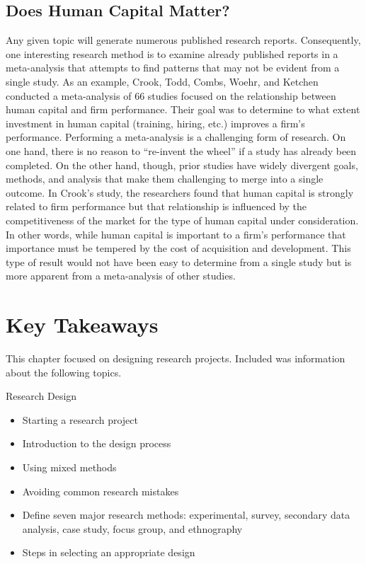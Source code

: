 \subsection{Does Human Capital Matter?}

Any given topic will generate numerous published research reports. Consequently, one interesting research method is to examine already published reports in a meta-analysis that attempts to find patterns that may not be evident from a single study. As an example, Crook, Todd, Combs, Woehr, and Ketchen conducted a meta-analysis of $ 66 $ studies focused on the relationship between human capital and firm performance\cite{crook2011does}. Their goal was to determine to what extent investment in human capital (training, hiring, etc.) improves a firm's performance. Performing a meta-analysis is a challenging form of research. On one hand, there is no reason to ``re-invent the wheel'' if a study has already been completed. On the other hand, though, prior studies have widely divergent goals, methods, and analysis that make them challenging to merge into a single outcome. In Crook's study, the researchers found that human capital is strongly related to firm performance but that relationship is influenced by the competitiveness of the market for the type of human capital under consideration. In other words, while human capital is important to a firm's performance that importance must be tempered by the cost of acquisition and development. This type of result would not have been easy to determine from a single study but is more apparent from a meta-analysis of other studies.

\section{Key Takeaways}\label{ch04:summary}

This chapter focused on designing research projects. Included was information about the following topics.

\begin{center}
	\begin{tkawybox}{Research Design}
		\begin{itemize}
			\setlength{\itemsep}{0pt}
			\setlength{\parskip}{0pt}
			\setlength{\parsep}{0pt}
			
			\item Starting a research project
			\item Introduction to the design process
			\item Using mixed methods
			\item Avoiding common research mistakes
			\item Define seven major research methods: experimental, survey, secondary data analysis, case study, focus group, and ethnography
			\item Steps in selecting an appropriate design
		\end{itemize}
	\end{tkawybox}
\end{center}

